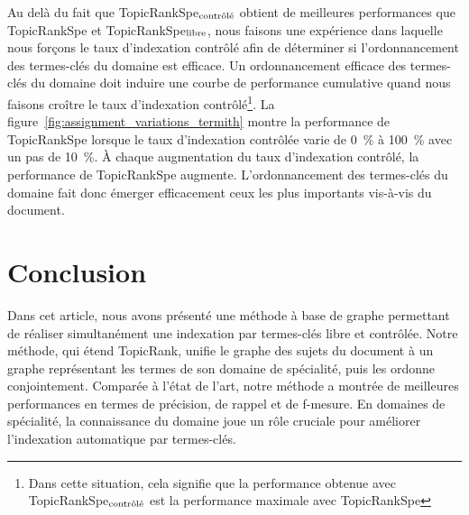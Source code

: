   Au delà du fait que TopicRankSpe$_\textnormal{contrôlé}$ obtient de
  meilleures performances que TopicRankSpe et
  TopicRankSpe$_\textnormal{libre}$, nous faisons une expérience dans
  laquelle nous forçons le taux d'indexation contrôlé afin de déterminer si
  l'ordonnancement des termes-clés du domaine est efficace.
  Un ordonnancement efficace des termes-clés du domaine doit induire une
  courbe de performance cumulative quand nous faisons croître le taux
  d'indexation contrôlé\footnote{Dans cette situation, cela signifie que la
  performance obtenue avec TopicRankSpe$_\textnormal{contrôlé}$ est la
  performance maximale avec TopicRankSpe}. La
  figure~\ref{fig:assignment_variations_termith} montre la performance de
  TopicRankSpe lorsque le taux d'indexation contrôlée varie de 0~\% à 100~\% avec un
  pas de 10~\%. À chaque augmentation du taux d'indexation contrôlé, la
  performance de TopicRankSpe augmente. L'ordonnancement des termes-clés du
  domaine fait donc émerger efficacement ceux les plus
  importants vis-à-vis du document.
  


\section{Conclusion}
\label{sec:main-domain_specific_keyphrase_annotation-conclusion}
  Dans cet article, nous avons présenté une méthode à base de graphe permettant
  de réaliser simultanément une indexation par termes-clés libre et contrôlée.
  Notre méthode, qui étend TopicRank, unifie le graphe des sujets du document à
  un graphe représentant les termes de son domaine de spécialité, puis les
  ordonne conjointement. Comparée à l'état de l'art, notre méthode a montrée de
  meilleures performances en termes de précision, de rappel et de f-mesure. En
  domaines de spécialité, la connaissance du domaine joue un rôle cruciale pour
  améliorer l'indexation automatique par termes-clés.


